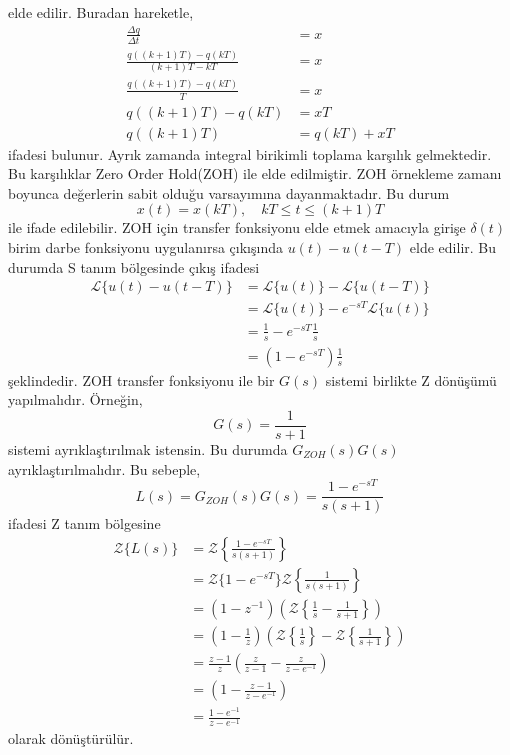 elde edilir. Buradan hareketle,
\begin{equation}
    \begin{split}
        \frac{\Delta q}{\Delta t}&=x\\
        \frac{q((k+1)T)-q(kT)}{(k+1)T-kT}&=x\\
        \frac{q((k+1)T)-q(kT)}{T}&=x\\
        q((k+1)T)-q(kT)&=xT\\
        q((k+1)T)&=q(kT)+xT
    \end{split}
\end{equation}
ifadesi bulunur. Ayrık zamanda integral birikimli toplama karşılık gelmektedir. Bu karşılıklar Zero Order Hold(ZOH) ile elde edilmiştir. ZOH örnekleme zamanı boyunca değerlerin sabit olduğu varsayımına dayanmaktadır. Bu durum
\begin{equation}
    x(t)=x(kT),\quad kT\leq t\leq (k+1)T
\end{equation}
ile ifade edilebilir. ZOH için transfer fonksiyonu elde etmek amacıyla girişe $\delta(t)$ birim darbe fonksiyonu uygulanırsa çıkışında $u(t)-u(t-T)$ elde edilir. Bu durumda S tanım bölgesinde çıkış ifadesi
\begin{equation}
\begin{split}
    \mathcal{L}\{u(t)-u(t-T)\}&=\mathcal{L}\{u(t)\}-\mathcal{L}\{u(t-T)\}\\
    &=\mathcal{L}\{u(t)\}-e^{-sT}\mathcal{L}\{u(t)\}\\
    &=\frac{1}{s}-e^{-sT}\frac{1}{s}\\
    &=(1-e^{-sT})\frac{1}{s}
\end{split}
\end{equation}
şeklindedir. ZOH transfer fonksiyonu ile bir $G(s)$ sistemi birlikte Z dönüşümü yapılmalıdır. Örneğin,
\begin{equation}
    G(s)=\frac{1}{s+1}
    \label{eqn:ornek_sistem}
\end{equation}
sistemi ayrıklaştırılmak istensin. Bu durumda $G_{ZOH}(s)G(s)$ ayrıklaştırılmalıdır. Bu sebeple,
\begin{equation}
    L(s)=G_{ZOH}(s)G(s)=\frac{1-e^{-sT}}{s(s+1)}
\end{equation}
ifadesi Z tanım bölgesine
\begin{equation}
\begin{split}
    \mathcal{Z}\{L(s)\}&=\mathcal{Z}\left\{\frac{1-e^{-sT}}{s(s+1)}\right\}\\
    &=\mathcal{Z}\{1-e^{-sT}\} \mathcal{Z}\left\{\frac{1}{s(s+1)} \right\}\\
    &=(1-z^{-1}) \left(\mathcal{Z}\left\{\frac{1}{s}-\frac{1}{s+1} \right\}\right)\\
    &=\left(1-\frac{1}{z}\right) \left(\mathcal{Z}\left\{\frac{1}{s}\right\}-\mathcal{Z}\left\{\frac{1}{s+1} \right\}\right)\\
    &=\frac{z-1}{z} \left(\frac{z}{z-1}-\frac{z}{z-e^{-1}}\right)\\
    &=\left(1-\frac{z-1}{z-e^{-1}}\right)\\
    &=\frac{1-e^{-1}}{z-e^{-1}}
\end{split}\label{eqn:ornek_sistem_zoh}
\end{equation}
olarak dönüştürülür.


